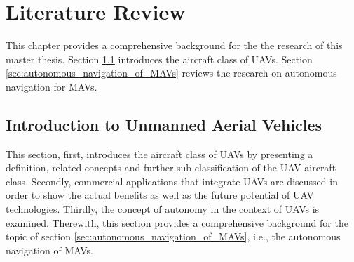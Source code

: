 
\chapter{Literature Review} \label{Chapter2}

This chapter provides a comprehensive background for the the research of this master thesis.
Section \ref{sec:introduction_to_MAVs} introduces the aircraft class of UAVs.
Section \ref{sec:autonomous_navigation_of_MAVs} reviews the research on autonomous navigation for MAVs.




\section{Introduction to Unmanned Aerial Vehicles}       \label{sec:introduction_to_MAVs}%

This section, first, introduces the aircraft class of UAVs
by presenting a definition, related concepts and further sub-classification of the UAV aircraft class.
Secondly, commercial applications that integrate UAVs are discussed
in order to show the actual benefits as well as the future potential of UAV technologies.
Thirdly, the concept of autonomy in the context of UAVs is examined.
Therewith, this section provides a comprehensive background for the topic of section \ref{sec:autonomous_navigation_of_MAVs},
i.e., the autonomous navigation of MAVs.

